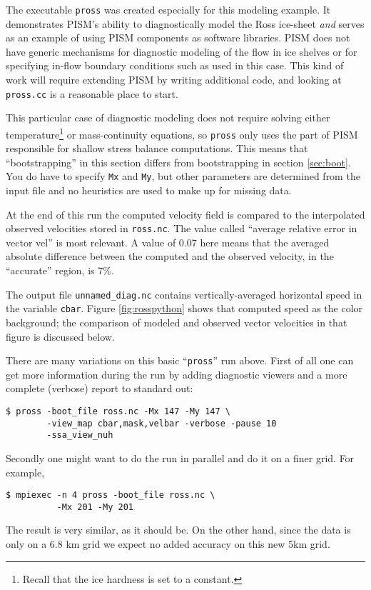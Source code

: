 The executable \texttt{pross} was created especially for this modeling example. It demonstrates PISM's ability to diagnostically model the Ross ice-sheet \emph{and} serves as an example of using PISM components as software libraries. PISM does not have generic mechanisms for diagnostic modeling of the flow in ice shelves or for specifying in-flow boundary conditions such as used in this case. This kind of work will require extending PISM by writing additional code, and looking at \texttt{pross.cc} is a reasonable place to start.

This particular case of diagnostic modeling does not require solving either temperature\footnote{Recall that the ice hardness is set to a constant.} or mass-continuity equations, so \texttt{pross} only uses the part of PISM responsible for shallow stress balance computations. This means that ``bootstrapping'' in this section differs from bootstrapping in section \ref{sec:boot}. You do have to specify \texttt{Mx} and \texttt{My}, but other parameters are determined from the input file and no heuristics are used to make up for missing data.

At the end of this run the computed velocity field is compared to the interpolated observed velocities stored in \texttt{ross.nc}.  The value called ``average relative error in vector vel'' is most relevant.  A value of 0.07 here means that the averaged absolute difference between the computed and the observed velocity, in the ``accurate'' region, is 7\%.

The output file \texttt{unnamed_diag.nc} contains vertically-averaged horizontal speed in the variable \texttt{cbar}.  Figure \ref{fig:rosspython} shows that computed speed as the color background; the comparison of modeled and observed vector velocities in that figure is discussed below.

There are many variations on this basic ``\texttt{pross}'' run above.  First of all one can get more information during the run by adding diagnostic viewers and a more complete (verbose) report to standard out:
\begin{verbatim}
$ pross -boot_file ross.nc -Mx 147 -My 147 \
        -view_map cbar,mask,velbar -verbose -pause 10
        -ssa_view_nuh
\end{verbatim}
Secondly one might want to do the run in parallel and do it on a finer grid.  For example,

\begin{verbatim}
$ mpiexec -n 4 pross -boot_file ross.nc \
          -Mx 201 -My 201
\end{verbatim}
The result is very similar, as it should be.  On the other hand, since the data is only on a 6.8 km grid we expect no added accuracy on this new 5km grid.

